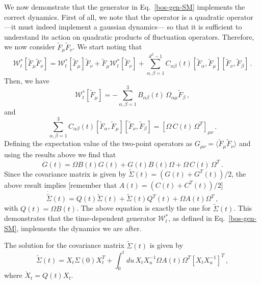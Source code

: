 \documentclass[prl,superscriptaddress,showpacs,longbibliography,reprint]{revtex4-2}
\begin{document}
We now demonstrate that the generator in Eq.~\eqref{bos-gen-SM} implements the correct dynamics. First of all, we note that the operator is a quadratic operator ---it must indeed implement a gaussian dynamics--- so that it is sufficient to understand its action on quadratic products of fluctuation operators. Therefore, we now consider $\tilde{F}_\mu \tilde{F}_\nu$.
We start noting  that 
$$
\mathcal{W}_t^*[\tilde{F}_\mu \tilde{F}_\nu]=\mathcal{W}_t^*\left[\tilde{F}_\mu\right]\tilde{F}_\nu+\tilde{F}_\mu\mathcal{W}^*_t\left[\tilde{F}_\nu\right]+\sum_{\alpha,\beta=1}^{d^2-1}C_{\alpha\beta}(t)\left[\tilde{F}_\alpha,\tilde{F}_\mu\right]\left[\tilde{F}_\nu,\tilde{F}_\beta\right]\, .
$$
Then, we have 
$$
\mathcal{W}^*_t\left[\tilde{F}_\mu\right]=-\sum_{\alpha,\beta=1}^{3}B_{\alpha\beta}(t)\, \Omega_{\alpha\mu} \tilde{F}_\beta\, ,
$$
and 
$$
\sum_{\alpha,\beta=1}^{3}C_{\alpha\beta}(t)\left[\tilde{F}_\alpha,\tilde{F}_\mu\right]\left[\tilde{F}_\nu,\tilde{F}_\beta\right]=\left[\Omega \, C(t) \, \Omega^T\right]_{\mu\nu}\, .
$$
Defining the expectation value of the two-point operators as $G_{\mu\nu}= \langle \tilde{F}_\mu \tilde{F}_\nu\rangle$ and using the results above we find that 
$$
\dot{G}(t)=\Omega B(t) G(t) +G(t) B(t)\Omega
+\Omega \, C(t)\, \Omega^T\, .
$$
Since the covariance matrix is given by $\tilde{\Sigma}(t)=\left(G(t)+G^T(t)\right)/2$, the above result implies [remember that $A(t)=(C(t)+C^T(t))/2$]
$$
\dot{\tilde{\Sigma}}(t)=Q(t)\tilde{\Sigma}(t)+\tilde{\Sigma}(t) Q^T(t)+\Omega A(t) \Omega^T\, ,
$$
with $Q(t)=\Omega B(t)$. The above equation is exactly the one for $\tilde{\Sigma}(t)$. This demonstrates that the time-dependent generator $\mathcal{W}_t^*$, as defined in Eq.~\eqref{bos-gen-SM}, implements the dynamics we are after.

The solution for the covariance matrix $\tilde{\Sigma}(t)$ is given by 
\begin{equation}
\tilde{\Sigma}(t)=X_t\Sigma(0) X^T_t+\int_0^t du\, X_t X^{-1}_u \Omega A(t) \Omega^T \left[X_t X^{-1}_u \right]^T\, ,
    \label{sol-bos-CM}
\end{equation}
where $\dot{X}_t=Q(t) X_t$.
\end{document}
